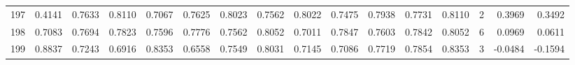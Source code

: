 \begin{tabular}{lrrrrrrrrrrrrrrr}
197 &      0.4141 &  0.7633 &  0.8110 &  0.7067 &  0.7625 &  0.8023 &  0.7562 &  0.8022 &  0.7475 &  0.7938 &   0.7731 &     0.8110 &      2 &                    0.3969 &                     0.3492 \\
198 &      0.7083 &  0.7694 &  0.7823 &  0.7596 &  0.7776 &  0.7562 &  0.8052 &  0.7011 &  0.7847 &  0.7603 &   0.7842 &     0.8052 &      6 &                    0.0969 &                     0.0611 \\
199 &      0.8837 &  0.7243 &  0.6916 &  0.8353 &  0.6558 &  0.7549 &  0.8031 &  0.7145 &  0.7086 &  0.7719 &   0.7854 &     0.8353 &      3 &                   -0.0484 &                    -0.1594 \\
\bottomrule
\end{tabular}
